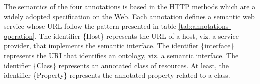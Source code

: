 \documentclass{singlecol-new}
\theoremstyle{TH}{
\newtheorem{lemma}{Lemma}
\newtheorem{theorem}[lemma]{Theorem}
\newtheorem{corrolary}[lemma]{Corrolary}
\newtheorem{conjecture}[lemma]{Conjecture}
\newtheorem{proposition}[lemma]{Proposition}
\newtheorem{claim}[lemma]{Claim}
\newtheorem{stheorem}[lemma]{Wrong Theorem}
\newtheorem{algorithm}{Algorithm}
}
\theoremstyle{THrm}{
\newtheorem{definition}{Definition}[section]
\newtheorem{question}{Question}[section]
\newtheorem{remark}{Remark}
\newtheorem{scheme}{Scheme}
}
\theoremstyle{THhit}{
\newtheorem{case}{Case}[section]
}
\begin{document}

The semantics of the four annotations is based in the HTTP methods which are a widely adopted specification on the Web.
Each annotation defines a semantic web service whose URL follow the pattern presented in table \ref{tab:annotations-operation}. 
The identifier \{Host\} represents the URL of a host, viz. a service provider, that implements the semantic interface. The identifier \{interface\} represents the URI that identifies an ontology, viz. a semantic interface.
The identifier \{Class\} represents an annotated class of resources. At least, the identifier \{Property\} represents the annotated property related to a class.
\end{document}
